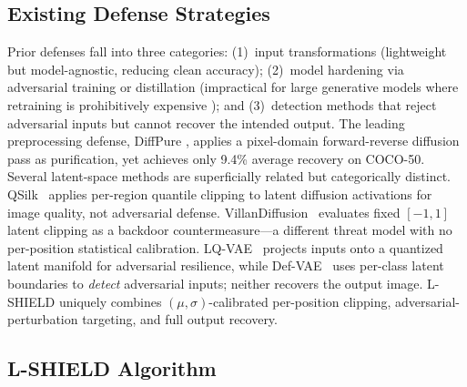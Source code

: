 \documentclass[conference]{IEEEtran}
\begin{document}
\subsection{Existing Defense Strategies}

Prior defenses fall into three categories: (1)~input transformations
\cite{guo2018countering} (lightweight but model-agnostic, reducing clean
accuracy); (2)~model hardening via adversarial training \cite{madry2018towards}
or distillation \cite{papernot2016distillation} (impractical for large
generative models where retraining is prohibitively expensive
\cite{athalye2018obfuscated}); and (3)~detection methods
\cite{costa2024deep,song2018pixeldefend} that reject adversarial inputs but
cannot recover the intended output. The leading preprocessing defense, DiffPure
\cite{nie2022diffusion}, applies a pixel-domain forward-reverse diffusion pass
as purification, yet achieves only 9.4\% average recovery on COCO-50.
Several latent-space methods are superficially related but categorically
distinct. QSilk~\cite{rychkovskiy2025qsilk} applies per-region quantile
clipping to latent diffusion activations for image quality, not adversarial
defense. VillanDiffusion~\cite{chou2023villandiffusion} evaluates fixed
$[-1,1]$ latent clipping as a backdoor countermeasure---a different threat
model with no per-position statistical calibration.
LQ-VAE~\cite{kyatham2019variational} projects inputs onto a quantized latent
manifold for adversarial resilience, while
Def-VAE~\cite{li2025defvae} uses per-class latent boundaries to
\emph{detect} adversarial inputs; neither recovers the output image.
L-SHIELD uniquely combines $(\mu,\sigma)$-calibrated per-position clipping,
adversarial-perturbation targeting, and full output recovery.

\subsection{L-SHIELD Algorithm}
\end{document}
